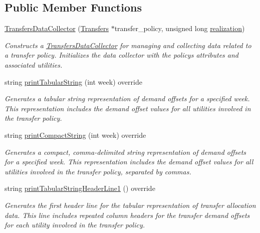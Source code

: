 \subsection*{Public Member Functions}
\begin{DoxyCompactItemize}
\item 
\mbox{\hyperlink{classTransfersDataCollector_a757289856b49a212a16b6263bfab8b7d}{Transfers\+Data\+Collector}} (\mbox{\hyperlink{classTransfers}{Transfers}} $\ast$transfer\+\_\+policy, unsigned long \mbox{\hyperlink{classDataCollector_a9ef2887466fe3123aa19ef956a219b96}{realization}})
\begin{DoxyCompactList}\small\item\em Constructs a {\ttfamily \mbox{\hyperlink{classTransfersDataCollector}{Transfers\+Data\+Collector}}} for managing and collecting data related to a transfer policy. Initializes the data collector with the policy\textquotesingle{}s attributes and associated utilities. \end{DoxyCompactList}\item 
string \mbox{\hyperlink{classTransfersDataCollector_a292b907e5c1000d8b3d868409637b9a6}{print\+Tabular\+String}} (int week) override
\begin{DoxyCompactList}\small\item\em Generates a tabular string representation of demand offsets for a specified week. This representation includes the demand offset values for all utilities involved in the transfer policy. \end{DoxyCompactList}\item 
string \mbox{\hyperlink{classTransfersDataCollector_aa5385877143c67a4d300032160239cfe}{print\+Compact\+String}} (int week) override
\begin{DoxyCompactList}\small\item\em Generates a compact, comma-\/delimited string representation of demand offsets for a specified week. This representation includes the demand offset values for all utilities involved in the transfer policy, separated by commas. \end{DoxyCompactList}\item 
string \mbox{\hyperlink{classTransfersDataCollector_a7c797fbccf4326b206b29529059dd622}{print\+Tabular\+String\+Header\+Line1}} () override
\begin{DoxyCompactList}\small\item\em Generates the first header line for the tabular representation of transfer allocation data. This line includes repeated column headers for the transfer demand offsets for each utility involved in the transfer policy. \end{DoxyCompactList}\item 

\end{DoxyCompactItemize}
